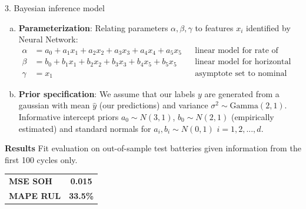 \documentclass[final]{beamer}
\newlength{\colwidth}
\begin{document}
\begin{frame}[t]
\begin{columns}[t]
\begin{column}{\colwidth}
\begin{block}{3. Bayesian inference model}
\begin{enumerate}[(a)]
        \item \textbf{Parameterization}: Relating parameters $\alpha, \beta, \gamma$ to features $x_i$ identified by Neural Network:
        \begin{align*}
            \alpha & = a_0 + a_1 x_1 + a_2 x_2 + a_3 x_3 + a_4 x_4 + a_5 x_5 && \text{linear model for rate of decay}\\
            \beta & = b_0 + b_1 x_1 + b_2 x_2 + b_3 x_3 + b_4 x_5 + b_5 x_5 && \text{linear model for horizontal translation}\\
            \gamma & = x_1 && \text{asymptote set to nominal discharge capacity}
        \end{align*}
        
        \item \textbf{Prior specification}: We assume that our labels $y$ are generated from a gaussian with mean $\hat{y}$ (our predictions) and variance $\sigma^2 \sim \text{Gamma}(2,1)$. Informative intercept priors $a_0 \sim N(3,1)$, $b_0 \sim N(2,1)$ (empirically estimated) and standard normals for $a_i, b_i \sim N(0,1)$ $i = 1, 2, ..., d$.
    \end{enumerate} 
    
    \begin{minipage}[t]{0.65\textwidth}
    \textbf{Results} Fit evaluation on out-of-sample test batteries given information from the first 100 cycles only. 
    \end{minipage}
    \begin{minipage}[t]{0.30\textwidth}
    \begin{flushright}
    \begin{tabular}{ l c }
       \textbf{MSE SOH} &  \textbf{0.015} \\
       \textbf{MAPE RUL} &  \textbf{33.5\%}
    \end{tabular}
    \end{flushright}
    \end{minipage}
    

\end{block}
\end{column}
\end{columns}
\end{frame}
\end{document}
